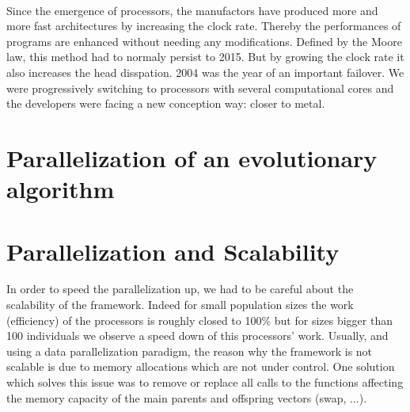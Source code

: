 
\paragraph{}

Since the emergence of processors, the manufactors have produced more and more fast architectures by increasing the clock rate. Thereby the performances of programs are enhanced without needing any modifications. Defined by the Moore law, this method had to normaly persist to 2015. But by growing the clock rate it also increases the head disspation. 2004 was the year of an important failover. We were progressively switching to processors with several computational cores and the developers were facing a new conception way: closer to metal.

\section{}


\section{Parallelization of an evolutionary algorithm}

\section{Parallelization and Scalability}

In order to speed the parallelization up, we had to be careful about the scalability of the framework. Indeed for small population sizes the work (efficiency) of the processors is roughly closed to 100\% but for sizes bigger than 100 individuals we observe a speed down of this processors' work. Usually, and using a data parallelization paradigm, the reason why the framework is not scalable is due to memory allocations which are not under control. One solution which solves this issue was to remove or replace all calls to the functions affecting the memory capacity of the main parents and offspring vectors (swap, ...).

